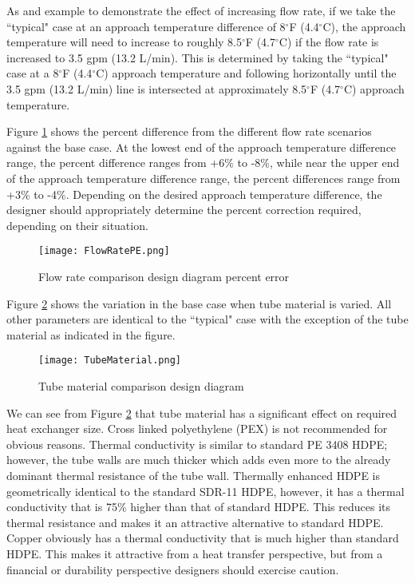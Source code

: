 As and example to demonstrate the effect of increasing flow rate, if we take the ``typical" case at an approach temperature difference of 8$^\circ$F (4.4$^\circ$C), the approach temperature will need to increase to roughly 8.5$^\circ$F (4.7$^\circ$C) if the flow rate is increased to 3.5 gpm (13.2 L/min). This is determined by taking the ``typical" case at a 8$^\circ$F (4.4$^\circ$C) approach temperature and following horizontally until the 3.5 gpm (13.2 L/min) line is intersected at approximately 8.5$^\circ$F (4.7$^\circ$C) approach temperature.

Figure \ref{fig:DesignTools:SpcCooling:FlowRatePE} shows the percent difference from the different flow rate scenarios against the base case. At the lowest end of the approach temperature difference range, the percent difference ranges from +6\% to -8\%, while near the upper end of the approach temperature difference range, the percent differences range from +3\% to -4\%. Depending on the desired approach temperature difference, the designer should appropriately determine the percent correction required, depending on their situation.

	\begin{figure}
		\centering
		\texttt{[image: FlowRatePE.png]}
		\caption{Flow rate comparison design diagram percent error}
		\label{fig:DesignTools:SpcCooling:FlowRatePE}
	\end{figure}

Figure \ref{fig:DesignTools:SpcCooling:TubeMaterial} shows the variation in the base case when tube material is varied. All other parameters are identical to the ``typical" case with the exception of the tube material as indicated in the figure.

	\begin{figure}
		\centering
		\texttt{[image: TubeMaterial.png]}
		\caption{Tube material comparison design diagram}
		\label{fig:DesignTools:SpcCooling:TubeMaterial}
	\end{figure}
	
We can see from Figure \ref{fig:DesignTools:SpcCooling:TubeMaterial} that tube material has a significant effect on required heat exchanger size. Cross linked polyethylene (PEX) is not recommended for obvious reasons. Thermal conductivity is similar to standard PE 3408 HDPE; however, the tube walls are much thicker which adds even more to the already dominant thermal resistance of the tube wall. Thermally enhanced HDPE is geometrically identical to the standard SDR-11 HDPE, however, it has a thermal conductivity that is 75\% higher than that of standard HDPE. This reduces its thermal resistance and makes it an attractive alternative to standard HDPE. Copper obviously has a thermal conductivity that is much higher than standard HDPE. This makes it attractive from a heat transfer perspective, but from a financial or durability perspective designers should exercise caution.

